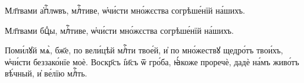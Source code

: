 \label{fiftypsalom}

\hKv Мл҃твами а҆пⷭ҇лѡвъ, млⷭ҇тиве, ѡ҆чи́сти мно́жєства  согрѣше́нїй на́шихъ.  
%

\hKv Мл҃твами бцⷣы, млⷭ҇тиве, ѡ҆чи́сти мно́жєства  согрѣше́нїй на́шихъ. 
%

\hKv Поми́лꙋй мѧ̀, бж҃е, по вели́цѣй млⷭ҇ти твое́й, и҆ по  мно́жествꙋ щедро́тъ твои́хъ, ѡ҆чи́сти беззако́нїе моѐ.  
%
 Воскр҃съ і҆и҃съ ѿ гро́ба, ꙗ҆́коже проречѐ, дадѐ  на́мъ живо́тъ вѣ́чный, и҆ ве́лїю млⷭ҇ть. 

